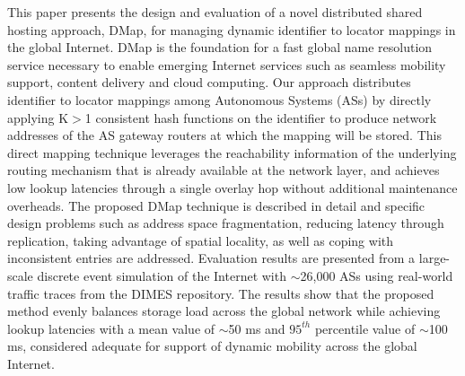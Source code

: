 This paper presents the design and evaluation of a novel distributed shared hosting approach, DMap, for managing dynamic identifier to locator mappings in the global Internet.  DMap is the foundation for a fast global name resolution service necessary to enable emerging Internet services such as seamless mobility support, content delivery and cloud computing.
Our approach distributes identifier to locator mappings among Autonomous Systems (ASs) by directly applying K$>$1 consistent hash functions on the identifier to produce network addresses of the AS gateway routers at which the mapping will be stored. This direct mapping technique leverages the reachability information of the underlying routing mechanism that is already available at the network layer, and achieves low lookup latencies through a single overlay hop without additional maintenance overheads. The proposed DMap technique is described in detail and specific design problems such as address space fragmentation, reducing latency through replication, taking advantage of spatial locality, as well as coping with inconsistent entries are addressed. Evaluation results are presented from a large-scale discrete event simulation of the Internet with $\sim$26,000 ASs using real-world traffic traces from the DIMES repository. The results show that the proposed method evenly balances storage load across the global network while achieving lookup latencies with a mean value of $\sim$50 ms and $95^{th}$ percentile value of $\sim$100 ms, considered adequate for support of dynamic mobility across the global Internet. 